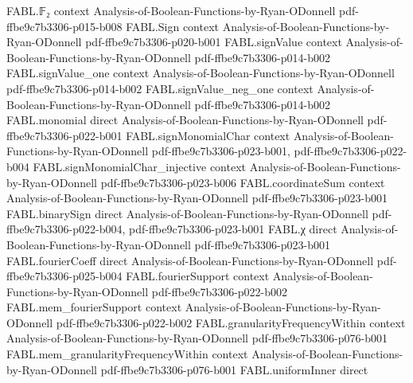 \begin{theorem}
\label{FABL.domainTranslate_fourier_expansion}
\leanok
{}
\proofstep
  {FABL.𝔽₂}
  {context}
  {Analysis-of-Boolean-Functions-by-Ryan-ODonnell}
  {pdf-ffbe9c7b3306-p015-b008}
\proofstep
  {FABL.Sign}
  {context}
  {Analysis-of-Boolean-Functions-by-Ryan-ODonnell}
  {pdf-ffbe9c7b3306-p020-b001}
\proofstep
  {FABL.signValue}
  {context}
  {Analysis-of-Boolean-Functions-by-Ryan-ODonnell}
  {pdf-ffbe9c7b3306-p014-b002}
\proofstep
  {FABL.signValue_one}
  {context}
  {Analysis-of-Boolean-Functions-by-Ryan-ODonnell}
  {pdf-ffbe9c7b3306-p014-b002}
\proofstep
  {FABL.signValue_neg_one}
  {context}
  {Analysis-of-Boolean-Functions-by-Ryan-ODonnell}
  {pdf-ffbe9c7b3306-p014-b002}
\proofstep
  {FABL.monomial}
  {direct}
  {Analysis-of-Boolean-Functions-by-Ryan-ODonnell}
  {pdf-ffbe9c7b3306-p022-b001}
\proofstep
  {FABL.signMonomialChar}
  {context}
  {Analysis-of-Boolean-Functions-by-Ryan-ODonnell}
  {pdf-ffbe9c7b3306-p023-b001,
    pdf-ffbe9c7b3306-p022-b004}
\proofstep
  {FABL.signMonomialChar_injective}
  {context}
  {Analysis-of-Boolean-Functions-by-Ryan-ODonnell}
  {pdf-ffbe9c7b3306-p023-b006}
\proofstep
  {FABL.coordinateSum}
  {context}
  {Analysis-of-Boolean-Functions-by-Ryan-ODonnell}
  {pdf-ffbe9c7b3306-p023-b001}
\proofstep
  {FABL.binarySign}
  {direct}
  {Analysis-of-Boolean-Functions-by-Ryan-ODonnell}
  {pdf-ffbe9c7b3306-p022-b004,
    pdf-ffbe9c7b3306-p023-b001}
\proofstep
  {FABL.χ}
  {direct}
  {Analysis-of-Boolean-Functions-by-Ryan-ODonnell}
  {pdf-ffbe9c7b3306-p023-b001}
\proofstep
  {FABL.fourierCoeff}
  {direct}
  {Analysis-of-Boolean-Functions-by-Ryan-ODonnell}
  {pdf-ffbe9c7b3306-p025-b004}
\proofstep
  {FABL.fourierSupport}
  {context}
  {Analysis-of-Boolean-Functions-by-Ryan-ODonnell}
  {pdf-ffbe9c7b3306-p022-b002}
\proofstep
  {FABL.mem_fourierSupport}
  {context}
  {Analysis-of-Boolean-Functions-by-Ryan-ODonnell}
  {pdf-ffbe9c7b3306-p022-b002}
\proofstep
  {FABL.granularityFrequencyWithin}
  {context}
  {Analysis-of-Boolean-Functions-by-Ryan-ODonnell}
  {pdf-ffbe9c7b3306-p076-b001}
\proofstep
  {FABL.mem_granularityFrequencyWithin}
  {context}
  {Analysis-of-Boolean-Functions-by-Ryan-ODonnell}
  {pdf-ffbe9c7b3306-p076-b001}
\proofstep
  {FABL.uniformInner}
  {direct}

\end{theorem}
